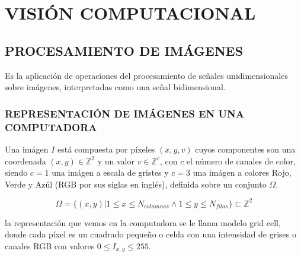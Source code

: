\section{VISIÓN COMPUTACIONAL}
    
    \subsection{PROCESAMIENTO DE IMÁGENES}
        Es la aplicación de operaciones del procesamiento de señales unidimensionales sobre imágenes, interpretadas como una señal bidimensional.
        \subsubsection{REPRESENTACIÓN DE IMÁGENES EN UNA COMPUTADORA}
        Una imágen $I$ está compuesta por píxeles $(x, y, v)$ cuyos componentes son una coordenada $(x, y) \in \mathbb{Z}^2$ y un valor $v \in \mathbb{Z}^c$, con $c$ el número de canales de color, siendo $c=1$ una imágen a escala de gristes y $c=3$ una imágen a colores Rojo, Verde y Azúl (RGB por sus siglas en inglés), definida sobre un conjunto $\Omega$. 
        
        \begin{equation}
            \Omega = \{(x, y)| 1 \leq x \leq N_{columnas} \land 1 \leq y \leq N_{filas}\} \subset \mathbb{Z}^2
        \end{equation}
        
        la representación que vemos en la computadora se le llama modelo grid cell, donde cada píxel es un cuadrado pequeño o celda con una intensidad de grises o canales RGB \citep{10.5555/2584519} con valores $0 \leq I_{x, y} \leq 255$.


